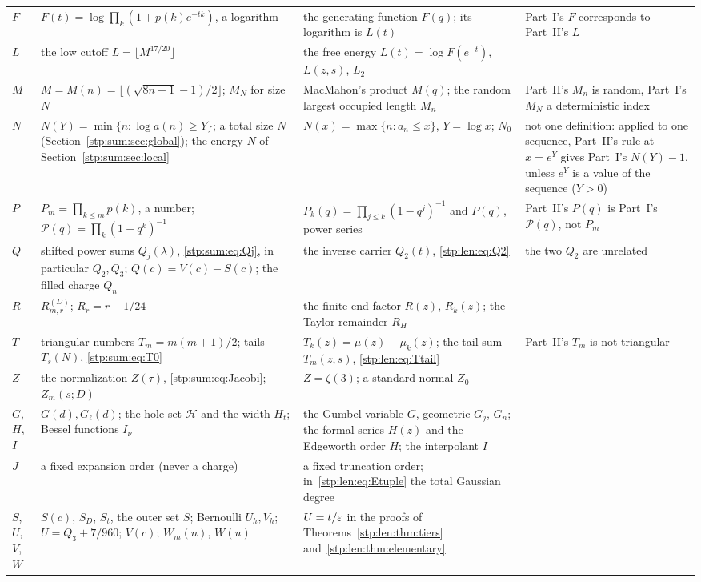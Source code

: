 \documentclass[11pt]{article}
\theoremstyle{remark}\newtheorem{remark}[theorem]{Remark}
\newcommand{\cH}{\mathcal H}
\newcommand{\cP}{\mathcal P}
\begin{document}
\begin{small}
\begin{longtable}{@{}>{\raggedright\arraybackslash}p{}>{\raggedright\arraybackslash}p{}>{\raggedright\arraybackslash}p{}>{\raggedright\arraybackslash}p{}@{}}
$F$ & $F(t)=\log\prod_k(1+p(k)e^{-tk})$, a logarithm & the generating function $F(q)$; its logarithm is $L(t)$ & Part~I's $F$ corresponds to Part~II's $L$\\
$L$ & the low cutoff $L=\lfloor M^{17/20}\rfloor$ & the free energy $L(t)=\log F(e^{-t})$, $L(z,s)$, $L_2$ & \\
$M$ & $M=M(n)=\lfloor(\sqrt{8n+1}-1)/2\rfloor$; $M_N$ for size $N$ & MacMahon's product $M(q)$; the random largest occupied length $M_n$ & Part~II's $M_n$ is random, Part~I's $M_N$ a deterministic index\\
$N$ & $N(Y)=\min\{n:\log a(n)\ge Y\}$; a total size $N$ (Section~\ref{stp:sum:sec:global}); the energy $N$ of Section~\ref{stp:sum:sec:local} & $N(x)=\max\{n:a_n\le x\}$, $Y=\log x$; $N_0$ & not one definition: applied to one sequence, Part~II's rule at $x=e^Y$ gives Part~I's $N(Y)-1$, unless $e^Y$ is a value of the sequence ($Y>0$)\\
$P$ & $P_m=\prod_{k\le m}p(k)$, a number; $\cP(q)=\prod_k(1-q^k)^{-1}$ & $P_k(q)=\prod_{j\le k}(1-q^j)^{-1}$ and $P(q)$, power series & Part~II's $P(q)$ is Part~I's $\cP(q)$, not $P_m$\\
$Q$ & shifted power sums $Q_j(\lambda)$, \eqref{stp:sum:eq:Qj}, in particular $Q_2,Q_3$; $Q(c)=V(c)-S(c)$; the filled charge $Q_n$ & the inverse carrier $Q_2(t)$, \eqref{stp:len:eq:Q2} & the two $Q_2$ are unrelated\\
$R$ & $R^{(D)}_{m,r}$; $R_r=r-1/24$ & the finite-end factor $R(z)$, $R_k(z)$; the Taylor remainder $R_H$ & \\
$T$ & triangular numbers $T_m=m(m+1)/2$; tails $T_s(N)$, \eqref{stp:sum:eq:T0} & $T_k(z)=\mu(z)-\mu_k(z)$; the tail sum $T_m(z,s)$, \eqref{stp:len:eq:Ttail} & Part~II's $T_m$ is not triangular\\
$Z$ & the normalization $Z(\tau)$, \eqref{stp:sum:eq:Jacobi}; $Z_m(s;D)$ & $Z=\zeta(3)$; a standard normal $Z_0$ & \\
$G$, $H$, $I$ & $G(d),G_\ell(d)$; the hole set $\cH$ and the width $H_t$; Bessel functions $I_\nu$ & the Gumbel variable $G$, geometric $G_j$, $G_n$; the formal series $H(z)$ and the Edgeworth order $H$; the interpolant $I$ & \\
$J$ & a fixed expansion order (never a charge) & a fixed truncation order; in~\eqref{stp:len:eq:Etuple} the total Gaussian degree & \\
$S$, $U$, $V$, $W$ &$S(c)$, $S_D$, $S_t$, the outer set $S$; Bernoulli $U_h,V_h$; $U=Q_3+7/960$; $V(c)$; $W_m(n)$, $W(u)$ & $U=t/\varepsilon$ in the proofs of Theorems~\ref{stp:len:thm:tiers} and~\ref{stp:len:thm:elementary} & \\

\end{longtable}
\end{small}
\end{document}
